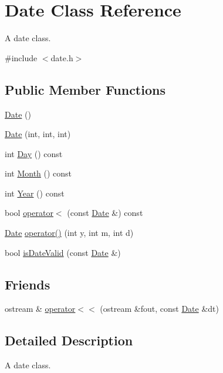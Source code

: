 \hypertarget{class_date}{}\section{Date Class Reference}
\label{class_date}


A date class.  




{\ttfamily \#include $<$date.\+h$>$}

\subsection*{Public Member Functions}
\begin{DoxyCompactItemize}
\item 
\hyperlink{class_date_a4e59ed4ba66eec61c27460c5d09fa1bd}{Date} ()
\item 
\hyperlink{class_date_af80a5016fde0d599f0a15900193fc663}{Date} (int, int, int)
\item 
int \hyperlink{class_date_ad7f2e4e42aadc85322503dbef8484ad5}{Day} () const
\item 
int \hyperlink{class_date_a1c1871e2d6adcb08fd30ffae440b3803}{Month} () const
\item 
int \hyperlink{class_date_a284f8985596b83ad9388b464eb6b54bd}{Year} () const
\item 
bool \hyperlink{class_date_a08c0538091d061550b90787d9313ca61}{operator$<$} (const \hyperlink{class_date}{Date} \&) const
\item 
\hyperlink{class_date}{Date} \hyperlink{class_date_a425bd02efac05e6b65a8b7456317822f}{operator()} (int y, int m, int d)
\item 
bool \hyperlink{class_date_a2d9a87adab3ae18acdb13e027ad1d0aa}{is\+Date\+Valid} (const \hyperlink{class_date}{Date} \&)
\end{DoxyCompactItemize}
\subsection*{Friends}
\begin{DoxyCompactItemize}
\item 
ostream \& \hyperlink{class_date_affced1a8a8f9f0e9dd009af0a22dfe33}{operator$<$$<$} (ostream \&fout, const \hyperlink{class_date}{Date} \&dt)
\end{DoxyCompactItemize}


\subsection{Detailed Description}
A date class. 



